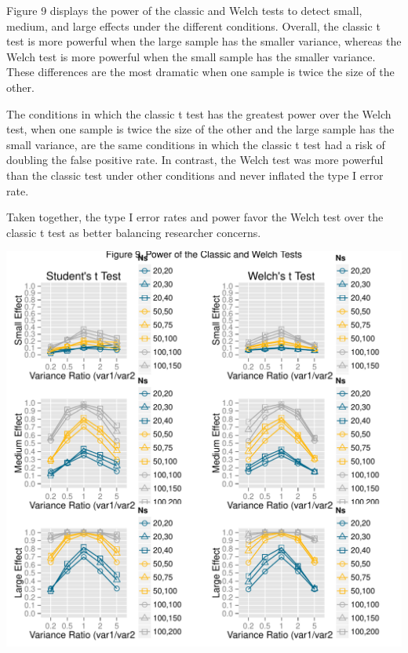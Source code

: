 \documentclass[man,a4paper,noextraspace]{apa6}\usepackage[]{graphicx}\usepackage[]{color}
\makeatletter
\def\maxwidth{ %
  \ifdim\Gin@nat@width>\linewidth
    \linewidth
  \else
    \Gin@nat@width
  \fi
}
\newenvironment{knitrout}{}{} %
\makeatother
\begin{document}
    Figure 9 displays the power of the classic and Welch tests to detect small, medium, and large effects under the different conditions. Overall, the classic t test is more powerful when the large sample has the smaller variance, whereas the Welch test is more powerful when the small sample has the smaller variance. These differences are the most dramatic when one sample is twice the size of the other. 
    
    The conditions in which the classic t test has the greatest power over the Welch test, when one sample is twice the size of the other and the large sample has the small variance, are the same conditions in which the classic t test had a risk of doubling the false positive rate. In contrast, the Welch test was more powerful than the classic test under other conditions and never inflated the type I error rate.

    Taken together, the type I error rates and power favor the Welch test over the classic t test as better balancing researcher concerns.

\begin{knitrout}
\color{fgcolor}
\includegraphics[width=\maxwidth]{figure/plot_power} 

\end{knitrout}
\end{document}
